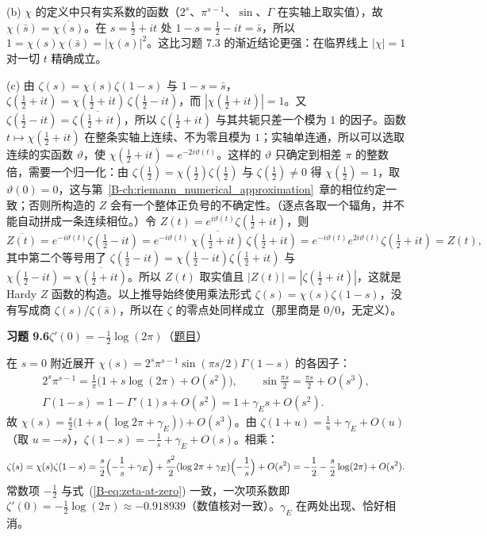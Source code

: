 \documentclass[11pt,a4paper]{article}
\newcommand{\bref}[1]{\ref*{B-#1}}
\newcommand{\Sol}[2]{%
  \par\addvspace{1.2em}\noindent
  \hypertarget{s:#1}{}\textbf{习题 #1\quad #2}\hfill{\small（\hyperlink{q:#1}{题目}）}\par
  \nopagebreak\smallskip}
\begin{document}
(b) $\chi$ 的定义中只有实系数的函数（$2^s$、$\pi^{s-1}$、$\sin$、$\Gamma$ 在实轴上取实值），故 $\chi(\bar s)=\overline{\chi(s)}$。在 $s=\tfrac12+it$ 处 $1-s=\tfrac12-it=\bar s$，所以
$1=\chi(s)\chi(\bar s)=|\chi(s)|^2$。这比习题 7.3 的渐近结论更强：在临界线上 $|\chi|=1$ 对一切 $t$ 精确成立。

(c) 由 $\zeta(s)=\chi(s)\zeta(1-s)$ 与 $1-s=\bar s$，$\zeta(\tfrac12+it)=\chi(\tfrac12+it)\,\zeta(\tfrac12-it)$，而 $|\chi(\tfrac12+it)|=1$。又 $\zeta(\tfrac12-it)=\overline{\zeta(\tfrac12+it)}$，所以 $\zeta(\tfrac12+it)$ 与其共轭只差一个模为 $1$ 的因子。函数 $t\mapsto\chi(\tfrac12+it)$ 在整条实轴上连续、不为零且模为 $1$；实轴单连通，所以可以选取连续的实函数 $\vartheta$，使 $\chi(\tfrac12+it)=e^{-2i\vartheta(t)}$。这样的 $\vartheta$ 只确定到相差 $\pi$ 的整数倍，需要一个归一化：由 $\zeta(\tfrac12)=\chi(\tfrac12)\zeta(\tfrac12)$ 与 $\zeta(\tfrac12)\ne0$ 得 $\chi(\tfrac12)=1$，取 $\vartheta(0)=0$，这与第~\bref{ch:riemann_numerical_approximation}~章的相位约定一致；否则所构造的 $Z$ 会有一个整体正负号的不确定性。（逐点各取一个辐角，并不能自动拼成一条连续相位。）令 $Z(t)=e^{i\vartheta(t)}\zeta(\tfrac12+it)$，则
\[
  \overline{Z(t)}=e^{-i\vartheta(t)}\zeta(\tfrac12-it)=e^{-i\vartheta(t)}\,\overline{\chi(\tfrac12+it)}\,\zeta(\tfrac12+it)=e^{-i\vartheta(t)}e^{2i\vartheta(t)}\zeta(\tfrac12+it)=Z(t),
\]
其中第二个等号用了 $\zeta(\tfrac12-it)=\chi(\tfrac12-it)\zeta(\tfrac12+it)$ 与 $\chi(\tfrac12-it)=\overline{\chi(\tfrac12+it)}$。所以 $Z(t)$ 取实值且 $|Z(t)|=|\zeta(\tfrac12+it)|$，这就是 Hardy $Z$ 函数的构造。以上推导始终使用乘法形式 $\zeta(s)=\chi(s)\zeta(1-s)$，没有写成商 $\zeta(s)/\zeta(\bar s)$，所以在 $\zeta$ 的零点处同样成立（那里商是 $0/0$，无定义）。

\Sol{9.6}{$\zeta'(0)=-\tfrac12\log(2\pi)$}
在 $s=0$ 附近展开 $\chi(s)=2^s\pi^{s-1}\sin(\pi s/2)\Gamma(1-s)$ 的各因子：
\[
\begin{gathered}
  2^s\pi^{s-1}=\frac1\pi\bigl(1+s\log(2\pi)+O(s^2)\bigr),\qquad
  \sin\frac{\pi s}2=\frac{\pi s}2+O(s^3),\\
  \Gamma(1-s)=1-\Gamma'(1)s+O(s^2)=1+\gamma_E s+O(s^2).
\end{gathered}
\]
故 $\chi(s)=\frac s2\bigl(1+s(\log2\pi+\gamma_E)\bigr)+O(s^3)$。由 $\zeta(1+u)=\frac1u+\gamma_E+O(u)$（取 $u=-s$），$\zeta(1-s)=-\frac1s+\gamma_E+O(s)$。相乘：
\[
  \zeta(s)=\chi(s)\zeta(1-s)=\frac s2\Bigl(-\frac1s+\gamma_E\Bigr)+\frac{s^2}2(\log2\pi+\gamma_E)\Bigl(-\frac1s\Bigr)+O(s^2)
  =-\frac12-\frac s2\log(2\pi)+O(s^2).
\]
常数项 $-\tfrac12$ 与式~(\bref{eq:zeta-at-zero}) 一致，一次项系数即 $\zeta'(0)=-\tfrac12\log(2\pi)\approx-0.918939$（数值核对一致）。$\gamma_E$ 在两处出现、恰好相消。
\end{document}
